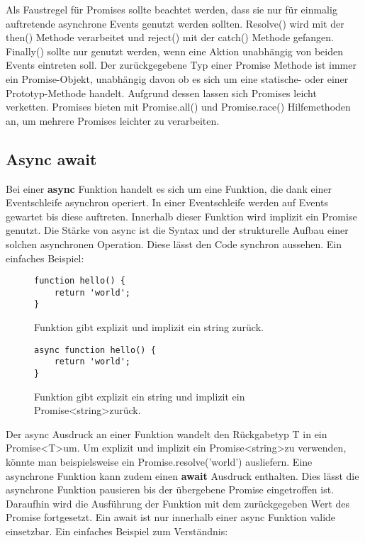 \noindent
Als Faustregel für Promises sollte beachtet werden, dass sie nur für einmalig auftretende asynchrone Events genutzt werden sollten. Resolve() wird mit der then() Methode verarbeitet und reject() mit der catch() Methode gefangen. Finally() sollte nur genutzt werden, wenn eine Aktion unabhängig von beiden Events eintreten soll. Der zurückgegebene Typ einer Promise Methode ist immer ein Promise-Objekt, unabhängig davon ob es sich um eine statische- oder einer Prototyp-Methode handelt. Aufgrund dessen lassen sich Promises leicht verketten. Promises bieten mit Promise.all() und Promise.race() Hilfemethoden an, um mehrere Promises leichter zu verarbeiten.

\subsection{Async await}
Bei einer \textbf{async} Funktion handelt es sich um eine Funktion, die dank einer Eventschleife asynchron operiert. In einer Eventschleife werden auf Events gewartet bis diese auftreten. Innerhalb dieser Funktion wird implizit ein Promise genutzt. Die Stärke von async ist die Syntax und der strukturelle Aufbau einer solchen asynchronen Operation. Diese lässt den Code synchron aussehen.\cite{async-await} Ein einfaches Beispiel:

\begin{figure}[H]
\begin{lstlisting}
function hello() {
    return 'world';
}
\end{lstlisting}
\caption{Funktion gibt explizit und implizit ein string zurück.}
\end{figure}

\begin{figure}[H]
\begin{lstlisting}
async function hello() {
    return 'world';
}
\end{lstlisting}
\caption{Funktion gibt explizit ein string und implizit ein Promise\textless string\textgreater zurück.}
\end{figure}

\noindent
Der async Ausdruck an einer Funktion wandelt den Rückgabetyp T in ein Promise\textless T\textgreater um. Um explizit und implizit ein Promise\textless string\textgreater zu verwenden, könnte man beispielsweise ein Promise.resolve('world') ausliefern. Eine asynchrone Funktion kann zudem einen \textbf{await} Ausdruck enthalten. Dies lässt die asynchrone Funktion pausieren bis der übergebene Promise eingetroffen ist. Daraufhin wird die Ausführung der Funktion mit dem zurückgegeben Wert des Promise fortgesetzt. Ein await ist nur innerhalb einer async Funktion valide einsetzbar. Ein einfaches Beispiel zum Verständnis:\\


